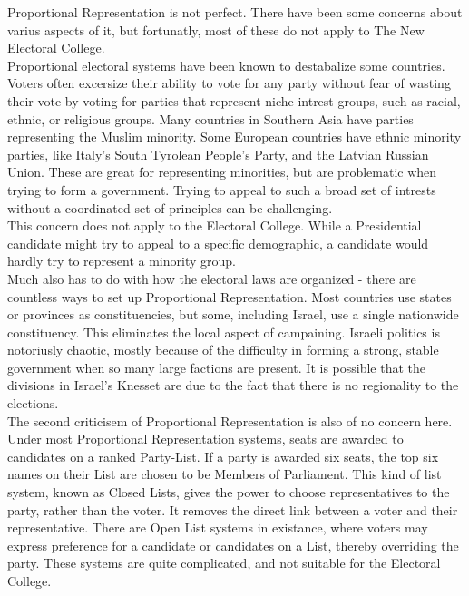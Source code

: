 \documentclass{article}
\begin{document}
    Proportional Representation is not perfect. There have been some concerns about varius aspects of it, but fortunatly, most of these do not apply to The New Electoral College.\\

    Proportional electoral systems have been known to destabalize some countries. Voters often excersize their ability to vote for any party without fear of wasting their vote by voting for parties that represent niche intrest groups, such as racial, ethnic, or religious groups. Many countries in Southern Asia have parties representing the Muslim minority. Some European countries have ethnic minority parties, like Italy's South Tyrolean People's Party, and the Latvian Russian Union. These are great for representing minorities, but are problematic when trying to form a government. Trying to appeal to such a broad set of intrests without a coordinated set of principles can be challenging.\\

    This concern does not apply to the Electoral College. While a Presidential candidate might try to appeal to a specific demographic, a candidate would hardly try to represent a minority group.\\

    Much also has to do with how the electoral laws are organized - there are countless ways to set up Proportional Representation. Most countries use states or provinces as constituencies, but some, including Israel, use a single nationwide constituency. This eliminates the local aspect of campaining. Israeli politics is notoriusly chaotic, mostly because of the difficulty in forming a strong, stable government when so many large factions are present. It is possible that the divisions in Israel's Knesset are due to the fact that there is no regionality to the elections.\\

    The second criticisem of Proportional Representation is also of no concern here. Under most Proportional Representation systems, seats are awarded to candidates on a ranked Party-List. If a party is awarded six seats, the top six names on their List are chosen to be Members of Parliament. This kind of list system, known as Closed Lists, gives the power to choose representatives to the party, rather than the voter. It removes the direct link between a voter and their representative. There are Open List systems in existance, where voters may express preference for a candidate or candidates on a List, thereby overriding the party. These systems are quite complicated, and not suitable for the Electoral College.\\
\end{document}

